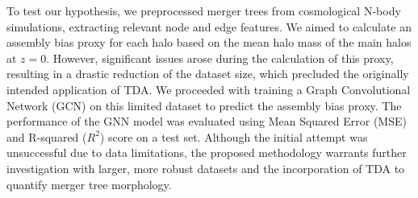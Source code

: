 \documentclass[twocolumn]{aastex631}
\begin{document}
To test our hypothesis, we preprocessed merger trees from cosmological N-body simulations, extracting relevant node and edge features. We aimed to calculate an assembly bias proxy for each halo based on the mean halo mass of the main halos at $z=0$. However, significant issues arose during the calculation of this proxy, resulting in a drastic reduction of the dataset size, which precluded the originally intended application of TDA. We proceeded with training a Graph Convolutional Network (GCN) on this limited dataset to predict the assembly bias proxy. The performance of the GNN model was evaluated using Mean Squared Error (MSE) and R-squared ($R^2$) score on a test set. Although the initial attempt was unsuccessful due to data limitations, the proposed methodology warrants further investigation with larger, more robust datasets and the incorporation of TDA to quantify merger tree morphology.
\end{document}
